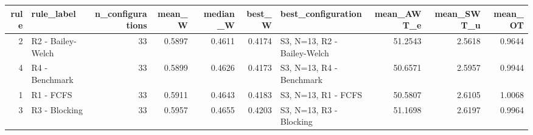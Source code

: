 \begin{tabular}{rlrrrrlrrr}
\toprule
rule & rule_label & n_configurations & mean_W & median_W & best_W & best_configuration & mean_AWT_e & mean_SWT_u & mean_OT \\
\midrule
2 & R2 - Bailey-Welch & 33 & 0.5897 & 0.4611 & 0.4174 & S3, N=13, R2 - Bailey-Welch & 51.2543 & 2.5618 & 0.9644 \\
4 & R4 - Benchmark & 33 & 0.5899 & 0.4626 & 0.4173 & S3, N=13, R4 - Benchmark & 50.6571 & 2.5957 & 0.9944 \\
1 & R1 - FCFS & 33 & 0.5911 & 0.4643 & 0.4183 & S3, N=13, R1 - FCFS & 50.5807 & 2.6105 & 1.0068 \\
3 & R3 - Blocking & 33 & 0.5957 & 0.4655 & 0.4203 & S3, N=13, R3 - Blocking & 51.1698 & 2.6197 & 0.9964 \\
\bottomrule
\end{tabular}

